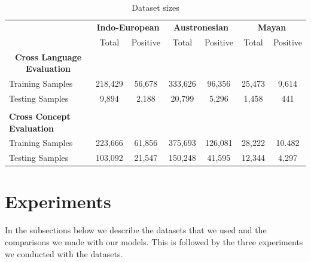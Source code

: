 \documentclass[11pt,letterpaper]{article}
\begin{document}
\begin{table}[t]
\centering
\begin{tabular}{lcccccc}
\multicolumn{1}{c}{\textbf{}} & \multicolumn{2}{c}{\textbf{Indo-European}} & \multicolumn{2}{c}{\textbf{Austronesian}} & \multicolumn{2}{c}{\textbf{Mayan}} \\
\multicolumn{1}{c}{}          & Total               & Positive             & Total               & Positive            & Total           & Positive         \\
\multicolumn{1}{c}{\textbf{Cross Language Evaluation}} & \multicolumn{2}{c}{\textbf{}}               &                 &                &             &             \\
Training Samples              & 218,429             & 56,678               & 333,626             & 96,356              & 25,473          & 9,614            \\
Testing Samples               & 9,894               & 2,188                & 20,799              & 5,296               & 1,458           & 441             \\
                                                       &                      &                      &                 &                &             &             \\
\textbf{Cross Concept Evaluation}                      &                      &                      &                 &                &             &             \\
Training Samples              & 223,666             & 61,856               & 375,693             & 126,081             & 28,222          & 10.482           \\
Testing Samples               & 103,092             & 21,547               & 150,248             & 41,595              & 12,344          & 4,297                       
\end{tabular}
\caption{Dataset sizes}
\label{C_count}
\end{table}

\section{Experiments}

In the subsections below we describe the datasets that we used and the comparisons we made with our models. This is followed by the three experiments we conducted with the datasets.
\end{document}
